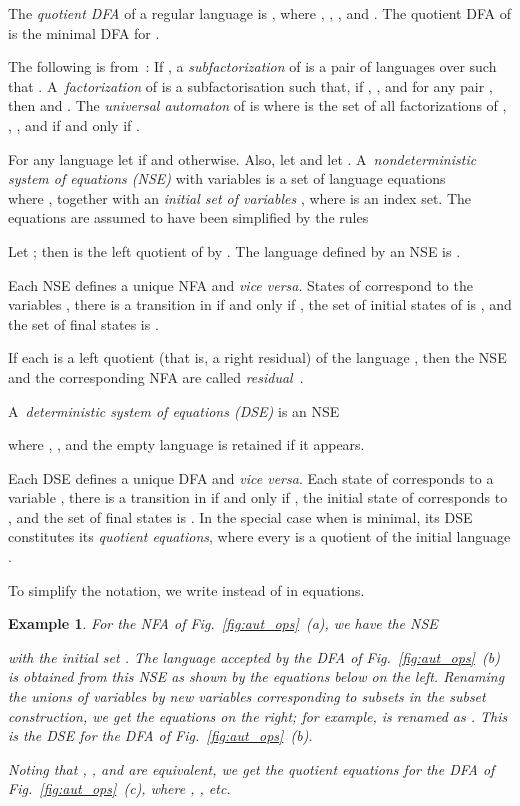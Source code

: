 \documentclass[preprint,12pt]{elsarticle}
\newcommand{\etc}{\mbox{\it etc.}}
\newcommand{\qedb}{\hfill}
\newtheorem{example}{Example}
\begin{document}
The \emph{quotient DFA} of a regular language  is 
, where , 
, 
,  and
.
The quotient DFA of  is the minimal DFA for .


The following is from~\cite{LoSa07}:
If , a \emph{subfactorization} 
of  is  a pair  of languages 
over  such that .
A~\emph{factorization} of  is 
a subfactorisation  such that, if ,  ,
and  for any pair , then  and .
The \emph{universal automaton} of  is 
 where  is the set of all factorizations
of , ,
, and
 if and only if .


For any language  let  if  and 
otherwise.
Also, let  and let .
A~\emph{nondeterministic system of equations (NSE)} with  variables 
 is a set of language equations \\

where ,  together with an 
\emph{initial set of variables}  , where  is an index set.
The equations are assumed to have been simplified by the rules

Let ; then  is the left quotient of  by .
The language defined by an NSE is .

Each NSE defines a unique NFA  and \emph{vice versa}. States of  correspond 
to the variables , there is a transition   
in  if and only if , the set of initial states of  is 
, and the set of final states is .

If each  is a left quotient (that is, a right residual) of the language 
, then the NSE and the corresponding NFA are called 
\emph{residual}~\cite{DLT02}.

A~\emph{deterministic system of equations (DSE)} 
is an NSE

where , , and 
the empty language  is retained if it appears. 

Each DSE defines a unique DFA  and \emph{vice versa}. Each state of  
corresponds to a variable , there is a transition  
 in  if and only if 
,
the initial state of  corresponds to , and the set of final states is 
.
In the special case when  is minimal, its DSE constitutes its 
\emph{quotient equations}, where every  is a quotient of the initial 
language .

To simplify the notation, we write  instead of  in  equations.
\begin{example}
\label{ex:NSE}
For the NFA of Fig.~\ref{fig:aut_ops}~(a), we have the NSE 

with the initial set 
.
The language  accepted by the DFA of Fig.~\ref{fig:aut_ops}~(b) 
is obtained  from this NSE as shown by the equations below on the left. 
Renaming the unions of variables by new variables corresponding to subsets in 
the subset construction, we get the equations on the right;
for example,  is renamed as .
This is
the DSE for the DFA of Fig.~\ref{fig:aut_ops}~(b). 

 Noting that , , and  are equivalent, 
we get the quotient equations for the DFA of Fig.~\ref{fig:aut_ops}~(c), 
where , , \etc
  
\qedb\end{example}
\end{document}
